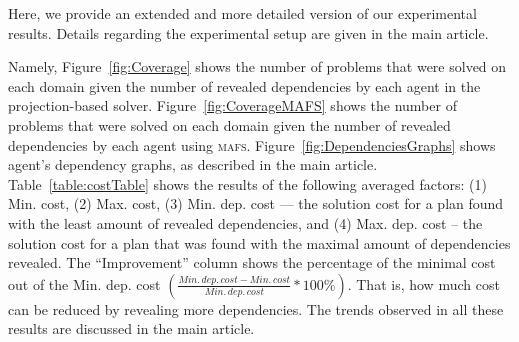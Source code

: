 \documentclass{article}
\newcommand{\mafs}{\textsc {mafs}\xspace}
\theoremstyle{remark}
\begin{document}
Here, we provide an extended and more detailed version of our experimental results. 
Details regarding the experimental setup are given in the main article. 

Namely, Figure~\ref{fig:Coverage} shows the number of problems that were solved on each domain given the number of revealed dependencies by each agent in the projection-based solver.
Figure~\ref{fig:CoverageMAFS} shows the number of problems that were solved on each domain given the number of revealed dependencies by each agent using \mafs.
Figure~\ref{fig:DependenciesGraphs} shows agent's dependency graphs, as described in the main article.
Table~\ref{table:costTable} shows the results of the following averaged factors: (1) Min. cost, (2) Max. cost, (3) Min. dep. cost --- the solution cost for a plan found with the least amount of revealed dependencies, 
and (4) Max. dep. cost -- the solution cost for a plan that was found with the maximal amount of dependencies revealed.
The ``Improvement'' column  shows  the percentage of the minimal cost out of the Min. dep. cost $(\frac{Min. \, dep. \, cost - Min. \, cost}{Min. \, dep. \, cost}*100\%)$. That is, how much cost can be reduced by revealing more dependencies. 
The trends observed in all these results are discussed in the main article.

\newpage
% 


\end{document}
